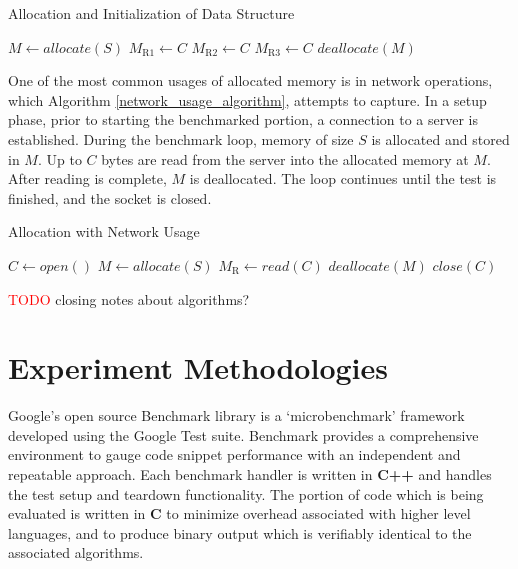 \documentclass[letterpaper, 10 pt, conference]{ieeeconf}  %
\newcommand*\todo[0]{\textcolor{red}{TODO }}
\begin{document}
\begin{algorithm}[h]
  \caption{Allocation and Initialization of Data Structure}
  \begin{algorithmic}
      \STATE $M \leftarrow allocate(S)$
      \STATE $M_\text{R1} \leftarrow C$
      \STATE $M_\text{R2} \leftarrow C$
      \STATE $M_\text{R3} \leftarrow C$
      \STATE $deallocate(M)$
    \ENDWHILE
  \end{algorithmic}
  \label{struct_usage_algorithm}
\end{algorithm}

One of the most common usages of allocated memory is in network operations, which Algorithm \ref{network_usage_algorithm}, attempts to capture.
In a setup phase, prior to starting the benchmarked portion, a connection to a server is established.
During the benchmark loop, memory of size $S$ is allocated and stored in $M$.
Up to $C$ bytes are read from the server into the allocated memory at $M$.
After reading is complete, $M$ is deallocated.
The loop continues until the test is finished, and the socket is closed.

\begin{algorithm}[h]
  \caption{Allocation with Network Usage}
  \begin{algorithmic}
    \STATE $C \leftarrow open()$
      \STATE $M \leftarrow allocate(S)$
      \STATE $M_\text{R} \leftarrow read(C)$
      \STATE $deallocate(M)$
    \ENDWHILE
    \STATE $close(C)$
  \end{algorithmic}
  \label{network_usage_algorithm}
\end{algorithm}

\todo closing notes about algorithms?

\section{Experiment Methodologies}
Google's open source Benchmark library is a `microbenchmark' framework developed using the Google Test suite. Benchmark provides a comprehensive environment to gauge code snippet performance with an independent and repeatable approach.
Each benchmark handler is written in \textbf{C++} and handles the test setup and teardown functionality.
The portion of code which is being evaluated is written in \textbf{C} to minimize overhead associated with higher level languages, and to produce binary output which is verifiably identical to the associated algorithms.
\end{document}
